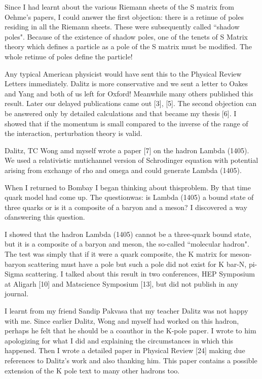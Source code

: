Since I had learnt about the various Riemann sheets of the S matrix from 
Oehme's papers, I could answer the first objection: there is a retinue 
of poles residing in all the Riemann sheets. These were subsequently 
called ``shadow poles". Because of the existence of shadow poles, one of 
the tenets of S Matrix theory which defines a particle as a pole of the 
S matrix must be modified. The whole retinue of poles define the 
particle!

Any typical American physicist would have sent this to the Physical 
Review Letters immediately. Dalitz is more conservative and we sent a 
letter to Oakes and Yang and both of us left for Oxford! Meanwhile many 
others published this result. Later our delayed publications came out 
[3], [5]. The second objection can be answered only by detailed 
calculations and that became my thesis [6]. I showed that if the momentum 
is small compared to the inverse of the range of the interaction, 
perturbation theory is valid.

Dalitz, TC Wong amd myself wrote a paper [7] on the hadron Lambda 
(1405). We used a relativistic mutichannel version of Schrodinger 
equation with potential arising from exchange of rho and omega and could 
generate Lambda (1405).

When I returned to Bombay I began thinking about this\break problem. By that 
time quark model had come up. The question\break was: is Lambda (1405) a bound 
state of three quarks or is it a composite of a baryon and a meson? I 
discovered a way of\break answering this question.

I showed that the hadron Lambda (1405) cannot be a three-quark bound 
state, but it is a composite of a baryon and meson, the so-called 
``molecular hadron". The test was simply that if it were a quark 
composite, the K matrix for meson-baryon scattering must have a pole but 
such a pole did not exist for K bar-N, pi-Sigma scattering. I talked 
about this result in two conferences, HEP Symposium at Aligarh [10] and 
Matscience Symposium [13], but did not publish in any journal.

I learnt from my friend Sandip Pakvasa that my teacher Dalitz was not 
happy with me. Since earlier Dalitz, Wong and myself had worked on this 
hadron, perhaps he felt that he should be a coauthor in the K-pole 
paper. I wrote to him apologizing for what I did and explaining the 
circumstances in which this happened. Then I wrote a detailed paper in 
Physical Review [24] making due references to Dalitz's work and also 
thanking him. This paper contains a possible extension of the K pole 
text to many other hadrons too.


